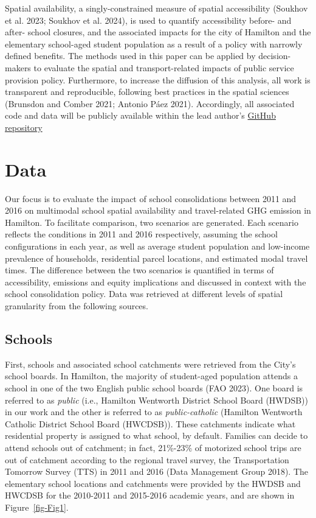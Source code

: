 \documentclass[
default
]{sn-jnl}
\begin{document}
Spatial availability, a singly-constrained measure of spatial
accessibility (Soukhov et al. 2023; Soukhov et al. 2024), is used to
quantify accessibility before- and after- school closures, and the
associated impacts for the city of Hamilton and the elementary
school-aged student population as a result of a policy with narrowly
defined benefits. The methods used in this paper can be applied by
decision-makers to evaluate the spatial and transport-related impacts of
public service provision policy. Furthermore, to increase the diffusion
of this analysis, all work is transparent and reproducible, following
best practices in the spatial sciences (Brunsdon and Comber 2021;
Antonio Páez 2021). Accordingly, all associated code and data will be
publicly available within the lead author's
\href{https://github.com/soukhova/School-closures-accessibility-impacts}{GitHub
repository}

\section{Data}\label{data}

Our focus is to evaluate the impact of school consolidations between
2011 and 2016 on multimodal school spatial availability and
travel-related GHG emission in Hamilton. To facilitate comparison, two
scenarios are generated. Each scenario reflects the conditions in 2011
and 2016 respectively, assuming the school configurations in each year,
as well as average student population and low-income prevalence of
households, residential parcel locations, and estimated modal travel
times. The difference between the two scenarios is quantified in terms
of accessibility, emissions and equity implications and discussed in
context with the school consolidation policy. Data was retrieved at
different levels of spatial granularity from the following sources.

\subsection{Schools}\label{schools}

First, schools and associated school catchments were retrieved from the
City's school boards. In Hamilton, the majority of student-aged
population attends a school in one of the two English public school
boards (FAO 2023). One board is referred to as \emph{public} (i.e.,
Hamilton Wentworth District School Board (HWDSB)) in our work and the
other is referred to as \emph{public-catholic} (Hamilton Wentworth
Catholic District School Board (HWCDSB)). These catchments indicate what
residential property is assigned to what school, by default. Families
can decide to attend schools out of catchment; in fact, 21\%-23\% of
motorized school trips are out of catchment according to the regional
travel survey, the Transportation Tomorrow Survey (TTS) in 2011 and 2016
(Data Management Group 2018). The elementary school locations and
catchments were provided by the HWDSB and HWCDSB for the 2010-2011 and
2015-2016 academic years, and are shown in Figure~\ref{fig-Fig1}.
\end{document}
